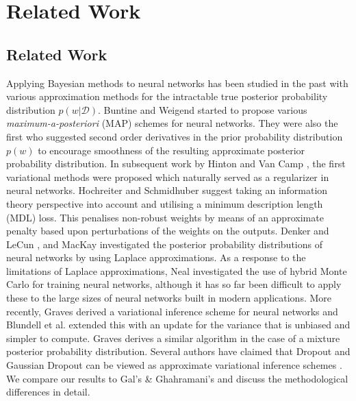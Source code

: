 \chapter{Related Work}

\ifpdf
    \graphicspath{{Chapter3/Figs/Raster/}{Chapter3/Figs/PDF/}{Chapter3/Figs/}}
\else
    \graphicspath{{Chapter3/Figs/Vector/}{Chapter3/Figs/}}
\fi

\section{Related Work}
Applying Bayesian methods to neural networks has been studied in the past with various approximation methods for the intractable true posterior probability distribution $p(w|\mathcal{D})$. Buntine and Weigend \cite{buntine1991bayesian} started to propose various \textit{maximum-a-posteriori} (MAP) schemes for neural networks. They were also the first who suggested second order derivatives in the prior probability distribution $p(w)$ to encourage smoothness of the resulting approximate posterior probability distribution. In subsequent work by Hinton and Van Camp \cite{hinton1993keeping}, the first variational methods were proposed which naturally served as a regularizer in neural networks. Hochreiter and Schmidhuber \cite{hochreiter1995simplifying} suggest taking an information theory perspective into account and utilising a minimum description length (MDL) loss. This penalises non-robust weights by means of an approximate penalty based upon perturbations of the weights on the outputs. Denker and LeCun \cite{denker1991transforming}, and MacKay \cite{mackay1995probable} investigated the posterior probability distributions of neural networks by using Laplace approximations. As a response to the limitations of Laplace approximations, Neal \cite{neal2012bayesian} investigated the use of hybrid Monte Carlo for training neural networks, although it has so far been difficult to apply these to the large sizes of neural networks built in modern applications. More recently, Graves \cite{graves2011practical} derived a variational inference scheme for neural networks and Blundell et al. \cite{blundell2015weight} extended this with an update for the variance that is unbiased and simpler to compute. Graves \cite{graves2016stochastic} derives a similar algorithm in the case of a mixture posterior probability distribution. 
\newline Several authors have claimed that Dropout \cite{srivastava2014dropout} and Gaussian Dropout \cite{wang2013fast} can be viewed as approximate variational inference schemes \cite{gal2015bayesian, kingma2015variational}. We compare our results to Gal's \& Ghahramani's \cite{gal2015bayesian} and discuss the methodological differences in detail.




